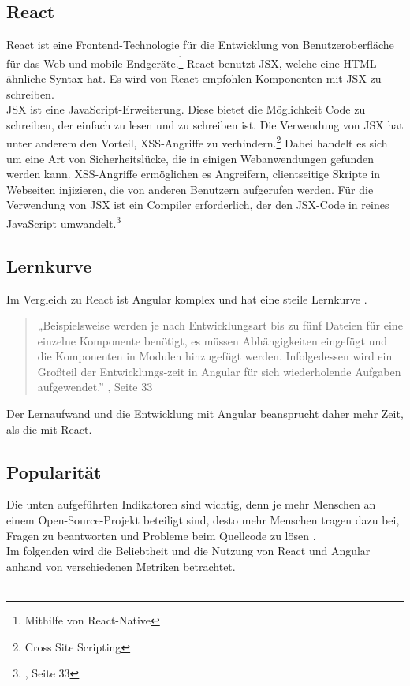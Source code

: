 \subsection*{React}
React ist eine Frontend-Technologie für die Entwicklung von Benutzeroberfläche für das Web und mobile Endgeräte\cite{GH08}.\footnote{Mithilfe von React-Native} React benutzt JSX, welche eine HTML-ähnliche Syntax hat. Es wird von React empfohlen Komponenten mit JSX zu schreiben\cite{JSX1}. 
\\
JSX ist eine JavaScript-Erweiterung. Diese bietet die Möglichkeit Code zu schreiben, der einfach zu lesen und zu schreiben ist. Die Verwendung von JSX hat unter anderem den Vorteil, XSS-Angriffe zu verhindern.\footnote{Cross Site Scripting{\cite{OWASP}}} \cite{JSX1} Dabei handelt es sich um eine Art von Sicherheitslücke, die in einigen Webanwendungen gefunden werden kann. XSS-Angriffe ermöglichen es Angreifern, clientseitige Skripte in Webseiten injizieren, die von anderen Benutzern aufgerufen werden. Für die Verwendung von JSX ist ein Compiler erforderlich, der den JSX-Code in reines JavaScript umwandelt.\footnote{{\cite{E01}, Seite 33}}

\subsection{Lernkurve}
Im Vergleich zu React ist Angular komplex und hat eine steile Lernkurve {\cite{E01}}.
\begin{quote}
  „Beispielsweise werden je nach Entwicklungsart bis zu fünf Dateien für eine einzelne Komponente benötigt, es müssen Abhängigkeiten eingefügt und die Komponenten in Modulen hinzugefügt werden. Infolgedessen wird ein Großteil der Entwicklungs-zeit in Angular für sich wiederholende Aufgaben aufgewendet.”
  {\cite{AN1}, Seite 33}
\end{quote}
Der Lernaufwand und die Entwicklung mit Angular beansprucht daher mehr Zeit, als die mit React.

\subsection{Popularität}
Die unten aufgeführten Indikatoren sind wichtig, denn je mehr Menschen an einem Open-Source-Projekt beteiligt sind, desto mehr Menschen tragen dazu bei, Fragen zu beantworten und Probleme beim Quellcode zu lösen {\cite{LIN1}}.
\\
Im folgenden wird die Beliebtheit und die Nutzung von React und Angular anhand von verschiedenen Metriken betrachtet.
\\\\
